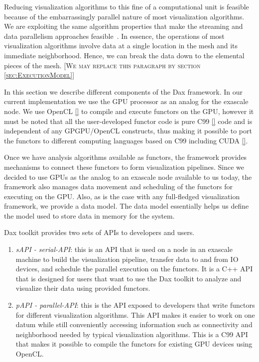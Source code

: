 \documentclass{vgtc}                          %
\newcommand*{\lcite}[1]{~\cite{#1}}
\newcommand{\sticky}[1]{{\color{red}\textsc{[#1]}}}
\begin{document}
Reducing visualization algorithms to this fine of a computational unit is
feasible because of the embarrassingly parallel nature of most
visualization algorithms.  We are exploiting the same algorithm properties
that make the streaming and data parallelism approaches
feasible\lcite{Ahrens00,Ahrens01}.  In essence, the operations of most
visualization algorithms involve data at a single location in the mesh and
its immediate neighborhood.  Hence, we can break the data down to the
elemental pieces of the mesh. 
\sticky{We may replace this paragraph by section \ref{sec:ExecutionModel}}

In this section we describe different components of the Dax framework. In our
current implementation we use the GPU processor as an analog for the exascale
node. We use OpenCL \ref{} to compile and execute functors on the GPU, however it must
be noted that all the user-developed functor code is pure C99 \ref{} code and
is independent of any GPGPU/OpenCL constructs, thus making it possible to port
the functors to different computing languages based on C99 including CUDA
\ref{}.

Once we have analysis algorithms available as functors, the framework provides 
mechanisms to connect these functors to form visualization pipelines. Since we
decided to use GPUs as the analog to an exascale node available to us today, the
framework also manages data movement and scheduling of the functors for
executing on the GPU. Also, as is the case with any full-fledged visualization
framework, we provide a data model. The data model essentially helps us
define the model used to store data in memory for the system. 

Dax toolkit provides two sets of APIs to developers and users.
\begin {enumerate}
\item \emph{sAPI - serial-API}: this is an API that is used on a node in an
exascale machine to build the visualization pipeline, transfer data to and from
IO devices, and schedule the parallel execution on the functors. It is a C++ API
that is designed for users that want to use the Dax toolkit to analyze and
visualize their data using provided functors.
\item \emph{pAPI - parallel-API}: this is the API exposed to developers that
write functors for different visualization algorithms. This API makes it easier
to work on one datum while still conveniently accessing information such as
connectivity and neighborhood needed by typical visualization algorithms. This
is a C99 API that makes it possible to compile the functors for
existing GPU devices using OpenCL.
\end {enumerate}
\end{document}
